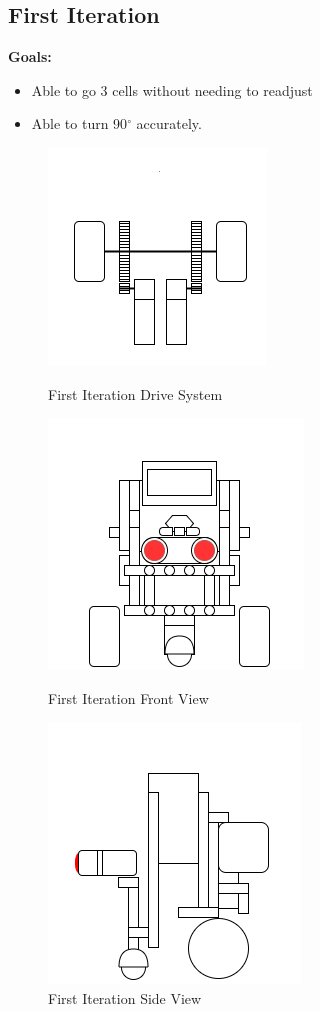 \documentclass[11pt]{article}
\begin{document}
\subsection{First Iteration}
\textbf{Goals:}
\begin{itemize}
\item Able to go 3 cells without needing to readjust
\item Able to turn 90$^{\circ}$ accurately.
\end{itemize}
\begin{figure}[htp]
\centering
\captionsetup{justification=centering}
\includegraphics[scale=0.80]{images/Hardware_Mechanical/First_Iteration_Design_Driving_System.png}
\caption{First Iteration Drive System}\label{fig:Drive System}
\endminipage\hfill
{}
\includegraphics[scale=0.70]{images/Hardware_Mechanical/First_Iteration_Design_FrontView.png}
\caption{First Iteration Front View}\label{fig:Front View}
\endminipage\hfill
{}
\includegraphics[scale=0.70]{images/Hardware_Mechanical/First_Iteration_Design_SideView.png}
\caption{First Iteration Side View}\label{Side View}
\endminipage
\end{figure}
\end{document}
